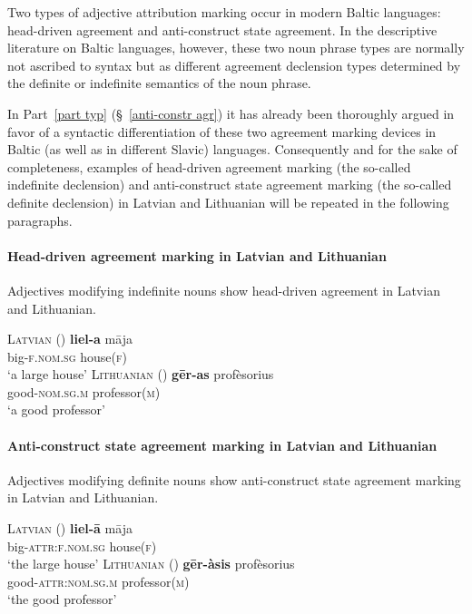 \noindent Two types of adjective attribution marking occur in modern Baltic languages: head-driven agreement and anti-construct state agreement. In the descriptive literature on Baltic languages, however, these two noun phrase types are normally not ascribed to syntax but as different agreement declension types determined by the definite or indefinite semantics of the noun phrase.

In Part~\ref{part typ} (\S~\ref{anti-constr agr}) it has already been thoroughly argued in favor of a syntactic differentiation of these two agreement marking devices in Baltic (as well as in different Slavic) languages. Consequently and for the sake of completeness, examples of head-driven agreement marking (the so-called indefinite declension) and anti-construct state agreement marking (the so-called definite declension) in Latvian and Lithuanian will be repeated in the following paragraphs.

\paragraph{Head-driven agreement marking in Latvian and Lithuanian} 
Adjectives modifying indefinite nouns show head-driven agreement in Latvian and Lithuanian.
\begin{exe}
\ex 
\begin{xlist}
\ex	\textsc{Latvian} (\citealt[115]{dahl2007})
\gll 	\textbf{liel-a} māja\\
	big-\textsc{f.nom.sg} house(\textsc{f})\\
\glt	‘a large house’
\ex \textsc{Lithuanian} (\citealt[13]{bechert1993})
\gll 	\textbf{gēr-as}			profèsorius\\
	good-\textsc{nom.sg.m} professor(\textsc{m})\\
\glt	‘a good professor’
\end{xlist}
\end{exe}

\paragraph{Anti-construct state agreement marking in Latvian and Lithuanian}
Adjectives modifying definite nouns show anti-construct state agreement marking in Latvian and Lithuanian.
\begin{exe}
\ex 
\begin{xlist}	
\ex	\textsc{Latvian} (\citealt[115]{dahl2007})
\gll 	\textbf{liel-ā} māja\\
	big-\textsc{attr:f.nom.sg} house(\textsc{f})\\
\glt	‘the large house’
\ex \textsc{Lithuanian} (\citealt[13]{bechert1993})
\gll 	\textbf{gēr-àsis}		profèsorius\\
	good-\textsc{attr:nom.sg.m}	professor(\textsc{m})\\
\glt	‘the good professor’
\end{xlist}
\end{exe}

